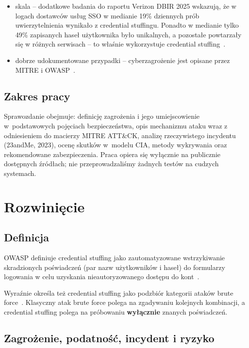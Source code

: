 \documentclass[12pt,a4paper]{article}
\begin{document}
\begin{itemize}
    \item skala -- dodatkowe badania do raportu Verizon DBIR 2025 wskazują, że w logach dostawców usług SSO w medianie 19\% dziennych prób uwierzytelnienia wynikało z credential stuffingu. Ponadto w medianie tylko 49\% zapisanych haseł użytkownika było unikalnych, a pozostałe powtarzały się w różnych serwisach -- to właśnie wykorzystuje credential stuffing~\cite{verizon2025}.
    \item dobrze udokumentowane przypadki -- cyberzagrożenie jest opisane przez MITRE i OWASP~\cite{mitre_t1110004,owasp_cs}.
\end{itemize}

\subsection{Zakres pracy}

Sprawozdanie obejmuje: definicję zagrożenia i jego umiejscowienie w~podstawowych pojęciach bezpieczeństwa, opis mechanizmu ataku wraz z odniesieniem do macierzy MITRE ATT\&CK, analizę rzeczywistego incydentu (23andMe, 2023), ocenę skutków w~modelu CIA, metody wykrywania oraz rekomendowane zabezpieczenia. Praca opiera się wyłącznie na publicznie dostępnych źródłach; nie przeprowadzaliśmy żadnych testów na cudzych systemach.

\newpage

\section{Rozwinięcie}

\subsection{Definicja}

OWASP definiuje credential stuffing jako zautomatyzowane wstrzykiwanie skradzionych poświadczeń (par nazw użytkowników i haseł) do formularzy logowania w celu uzyskania nieautoryzowanego dostępu do kont~\cite{owasp_cs}.

Wyraźnie określa też credential stuffing jako podzbiór kategorii ataków brute force~\cite{owasp_cs}. Klasyczny atak brute force polega na zgadywaniu kolejnych kombinacji, a credential stuffing polega na próbowaniu \textbf{wyłącznie} znanych poświadczeń.

\subsection{Zagrożenie, podatność, incydent i ryzyko}
\end{document}
